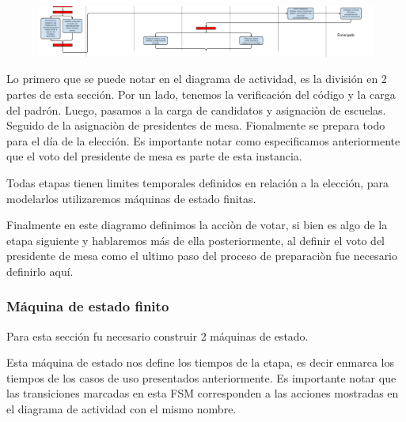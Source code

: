 \begin{figure}[h!]
\centering
\includegraphics[scale=0.5]{imagenes/actividad/actividadPreparacion3}
\end{figure}


Lo primero que se puede notar en el diagrama de actividad, es la división en 2 partes de esta sección. Por un lado, tenemos la verificación del código y la carga del padrón. Luego, pasamos a la carga de candidatos y asignaciòn de escuelas. Seguido de la asignaciòn de presidentes de mesa. Fionalmente se prepara todo para el día de la elección. Es importante notar como especificamos anteriormente que el voto del presidente de mesa es parte de esta instancia. 

Todas etapas tienen limites temporales definidos en relación a la elección, para modelarlos utilizaremos máquinas de estado finitas.

Finalmente en este diagramo definimos la acciòn de votar, si bien es algo de la etapa siguiente y hablaremos más de ella posteriormente, al definir el voto del presidente de mesa como el ultimo paso del proceso de preparaciòn fue necesario definirlo aquí.


\subsubsection{Máquina de estado finito}

Para esta sección fu necesario construir 2 máquinas de estado.

\begin{figure}[h!]
\centering
\end{figure}

Esta máquina de estado nos define los tiempos de la etapa, es decir enmarca los tiempos de los casos de uso presentados anteriormente. Es importante notar que las transiciones marcadas en esta FSM corresponden a las acciones mostradas en el diagrama de actividad con el mismo nombre.

\begin{figure}[h!]
\centering
\end{figure}

